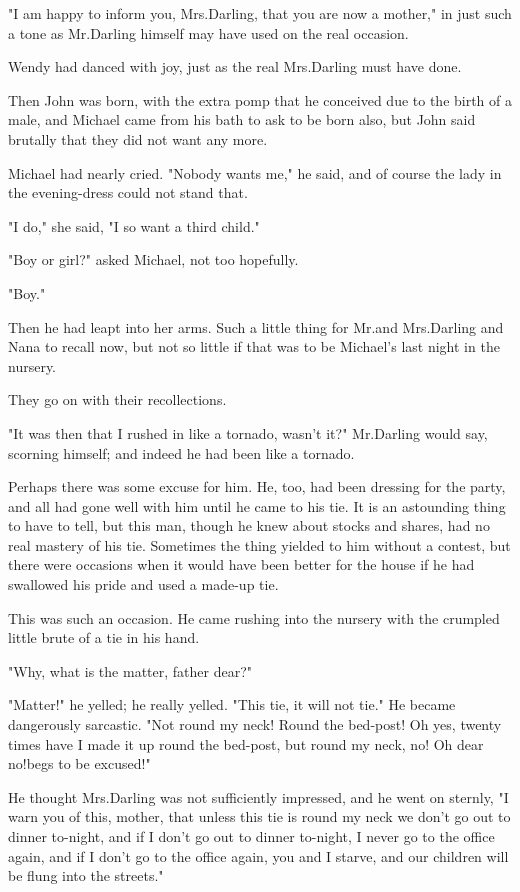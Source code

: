 "I am happy to inform you, Mrs.\@ Darling, that you are now a mother," in just such a tone as Mr.\@ Darling himself may have used on the real occasion.

Wendy had danced with joy, just as the real Mrs.\@ Darling must have done.

Then John was born, with the extra pomp that he conceived due to the birth of a male, and Michael came from his bath to ask to be born also, but John said brutally that they did not want any more.

Michael had nearly cried.
"Nobody wants me," he said, and of course the lady in the evening-dress could not stand that.

"I do," she said, "I so want a third child."

"Boy or girl?\@" asked Michael, not too hopefully.

"Boy."

Then he had leapt into her arms.
Such a little thing for Mr.\@ and Mrs.\@ Darling and Nana to recall now, but not so little if that was to be Michael's last night in the nursery.

They go on with their recollections.

"It was then that I rushed in like a tornado, wasn't it?\@" Mr.\@ Darling would say, scorning himself;
and indeed he had been like a tornado.

Perhaps there was some excuse for him.
He, too, had been dressing for the party, and all had gone well with him until he came to his tie.
It is an astounding thing to have to tell, but this man, though he knew about stocks and shares, had no real mastery of his tie.
Sometimes the thing yielded to him without a contest, but there were occasions when it would have been better for the house if he had swallowed his pride and used a made-up tie.

This was such an occasion.
He came rushing into the nursery with the crumpled little brute of a tie in his hand.

"Why, what is the matter, father dear?"

"Matter!\@" he yelled;
he really yelled.
"This tie, it will not tie."
He became dangerously sarcastic.
"Not round my neck!
Round the bed-post!
Oh yes, twenty times have I made it up round the bed-post, but round my neck, no!
Oh dear no!\@ begs to be excused!"

He thought Mrs.\@ Darling was not sufficiently impressed, and he went on sternly, "I warn you of this, mother, that unless this tie is round my neck we don't go out to dinner to-night, and if I don't go out to dinner to-night, I never go to the office again, and if I don't go to the office again, you and I starve, and our children will be flung into the streets."

